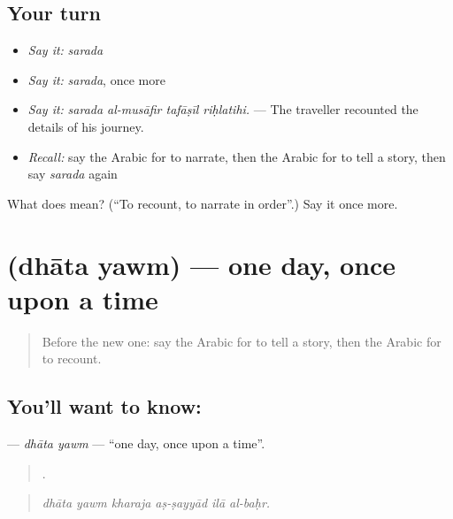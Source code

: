 \subsection*{Your turn}
\begin{itemize}
\raggedright
  \item \emph{Say it:} \emph{sarada}
  \item \emph{Say it:} \emph{sarada}, once more
  \item \emph{Say it:} \emph{sarada al-musāfir tafāṣīl riḥlatihi.} — The traveller recounted the details of his journey.
  \item \emph{Recall:} say the Arabic for to narrate, then the Arabic for to tell a story, then say \emph{sarada} again
\end{itemize}

\begin{tcolorbox}[breakable,colback=teal!4,colframe=teal!35!black,title={Before you move on}]
What does  mean? (\textquotedblleft{}To recount, to narrate in order\textquotedblright{}.) Say it once more.
\end{tcolorbox}
\section[\texorpdfstring{\ar{ذات} \ar{يوم} (dhāta yawm)}{ذات يوم (dhāta yawm)}]{  (dhāta yawm) — one day, once upon a time}

\label{lesson:AR-C295-dhata-yawm}



\begin{quote}
Before the new one: say the Arabic for to tell a story, then the Arabic for to recount.
\end{quote}

\subsection*{You'll want to know:  }
\textbf{ } — \emph{dhāta yawm} — \textquotedblleft{}one day, once upon a time\textquotedblright{}.

\begin{quote}
     .
\end{quote}

\begin{quote}
\emph{dhāta yawm kharaja aṣ-ṣayyād ilā al-baḥr.}
\end{quote}

